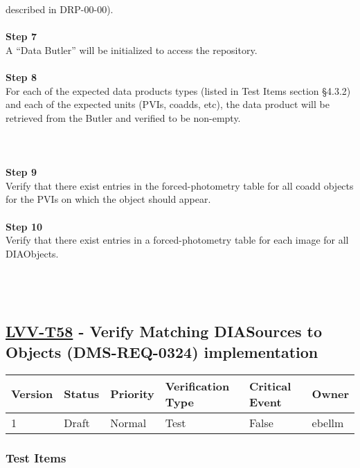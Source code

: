 described in DRP-00-00).\\
~\\
\textbf{Step 7}\\
A ``Data Butler'' will be initialized to access the repository.\\
~\\
\textbf{Step 8}\\
For each of the expected data products types (listed in Test Items
section §4.3.2) and each of the expected units (PVIs, coadds, etc), the
data product will be retrieved from the Butler and verified to be
non-empty.\\
~\\
~\\
~\\
\textbf{Step 9}\\
Verify that there exist entries in the forced-photometry table for all
coadd objects for the PVIs on which the object should appear.\\
~\\
\textbf{Step 10}\\
Verify that there exist entries in a forced-photometry table for each
image for all DIAObjects.\\
~\\
~\\
~\\

\hypertarget{lvv-t58---verify-matching-diasources-to-objects-dms-req-0324-implementation}{%
\subsection{\texorpdfstring{\href{https://jira.lsstcorp.org/secure/Tests.jspa\#/testCase/LVV-T58}{LVV-T58}
- Verify Matching DIASources to Objects (DMS-REQ-0324)
implementation}{LVV-T58 - Verify Matching DIASources to Objects (DMS-REQ-0324) implementation}}\label{lvv-t58---verify-matching-diasources-to-objects-dms-req-0324-implementation}}

\begin{longtable}[]{@{}llllll@{}}
\toprule
Version & Status & Priority & Verification Type & Critical Event &
Owner\tabularnewline
\midrule
\endhead
1 & Draft & Normal & Test & False & ebellm\tabularnewline
\bottomrule
\end{longtable}

\hypertarget{test-items-21}{%
\subsubsection{Test Items}\label{test-items-21}}

